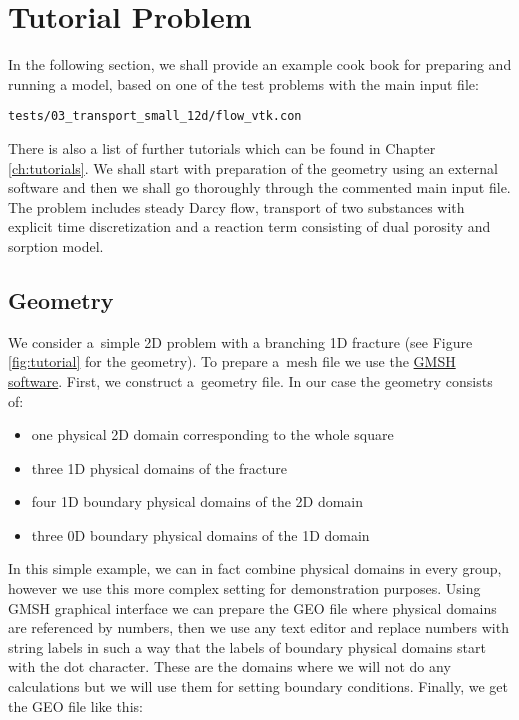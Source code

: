 

\section{Tutorial Problem}
In the following section, we shall provide an example cook book for preparing and running a model,
based on one of the test problems with the main input file:
\begin{verbatim}
tests/03_transport_small_12d/flow_vtk.con
\end{verbatim}
There is also a list of further tutorials which can be found in Chapter \ref{ch:tutorials}.
We shall start with preparation of the geometry using an external software and then we shall go thoroughly through the 
commented main input file. The problem includes steady Darcy flow, transport of two substances with explicit
time discretization and a reaction term consisting of dual porosity and sorption model.

\subsection{Geometry}
We consider a~simple 2D problem with a branching 1D fracture (see Figure \ref{fig:tutorial} for the geometry). 
To prepare a~mesh file we use the \href{http://geuz.org/gmsh/}{GMSH software}.
First, we construct a~geometry file. In our case the geometry consists of: 
\begin{itemize}
 \item one physical 2D domain corresponding to the whole square
 \item three 1D physical domains of the fracture
 \item four 1D boundary physical domains of the 2D domain
 \item three 0D boundary physical domains of the 1D domain
\end{itemize}
In this simple example, we can in fact combine physical domains in every group, however we use this more complex setting for
demonstration purposes. Using GMSH graphical interface we can prepare the GEO file where physical domains are referenced by numbers, then we use 
any text editor and replace numbers with string labels in such a way that the labels of boundary physical domains start with the dot character. 
These are the domains where we will not do any calculations but we will use them for setting boundary conditions.
Finally, we get the GEO file like this:

